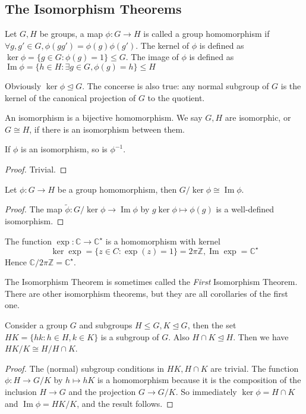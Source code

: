\subsection{The Isomorphism Theorems}
\begin{definition}
    Let $G,H$ be groups, a map $\phi:G\to H$ is called a group homomorphism if $\forall g,g'\in G,\phi(gg')=\phi(g)\phi(g')$.
    The kernel of $\phi$ is defined as $\ker\phi=\{g\in G:\phi(g)=1\}\le G$.
    The image of $\phi$ is defined as $\operatorname{Im}\phi=\{h\in H:\exists g\in G,\phi(g)=h\}\le H$
\end{definition}
Obviously $\ker\phi\unlhd G$.
The concerse is also true: any normal subgroup of $G$ is the kernel of the canonical projection of $G$ to the quotient.
\begin{definition}
    An isomorphism is a bijective homomorphism.
    We say $G,H$ are isomorphic, or $G\cong H$, if there is an isomorphism between them.
\end{definition}
\begin{proposition}
    If $\phi$ is an isomorphism, so is $\phi^{-1}$.
\end{proposition}
\begin{proof}
    Trivial.
\end{proof}
\begin{theorem}
    Let $\phi:G\to H$ be a group homomorphism, then $G/\ker\phi\cong\operatorname{Im}\phi$.
\end{theorem}
\begin{proof}
    The map $\tilde{\phi}:G/\ker\phi\to\operatorname{Im}\phi$ by $g\ker\phi\mapsto \phi(g)$ is a well-defined isomorphism.
\end{proof}
\begin{example}
    The function $\exp:\mathbb C\to\mathbb C^\star$ is a homomorphism with kernel
    $$\ker\exp=\{z\in C:\exp(z)=1\}=2\pi\mathbb Z,\operatorname{Im}\exp=\mathbb C^\star$$
    Hence $\mathbb C/2\pi\mathbb Z=\mathbb C^\star$.
\end{example}
The Isomorphism Theorem is sometimes called the \textit{First} Isomorphism Theorem.
There are other isomorphism theorems, but they are all corollaries of the first one.
\begin{corollary}
    Consider a group $G$ and subgroups $H\le G,K\unlhd G$, then the set $HK=\{hk:h\in H,k\in K\}$ is a subgroup of $G$.
    Also $H\cap K\unlhd H$.
    Then we have $HK/K\cong H/H\cap K$.
\end{corollary}
\begin{proof}
    The (normal) subgroup conditions in $HK,H\cap K$ are trivial.
    The function $\phi:H\to G/K$ by $h\mapsto hK$ is a homomorphism because it is the composition of the inclusion $H\to G$ and the projection $G\to G/K$.
    So immediately $\ker\phi=H\cap K$ and $\operatorname{Im}\phi=HK/K$, and the result follows.
\end{proof}
